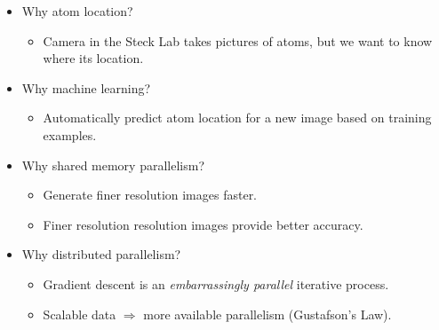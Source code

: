 \documentclass{beamer}
\begin{document}
\begin{frame}

\begin{itemize}
\item Why atom location?
	\begin{itemize}
	\item Camera in the Steck Lab takes pictures of atoms, but we want to know where its location.
	\end{itemize}
\item Why machine learning? 
	\begin{itemize}
	\item Automatically predict atom location for a new image based on training examples.
	\end{itemize}
\item Why shared memory parallelism?
	\begin{itemize}
	\item Generate finer resolution images faster.
	\item Finer resolution resolution images provide better accuracy. 
	\end{itemize}
\item Why distributed parallelism? 
	\begin{itemize}
	\item Gradient descent is an \emph{embarrassingly parallel} iterative process.
	\item Scalable data $\Rightarrow$ more available parallelism (Gustafson's Law).
	\end{itemize}
\end{itemize}

\end{frame}
\end{document}
